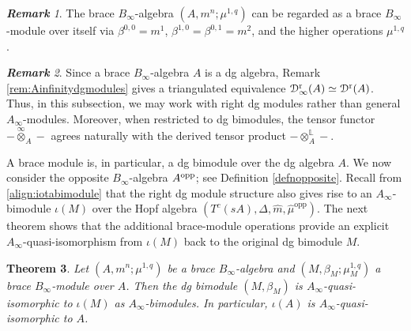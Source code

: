 \documentclass[a4paper, 11pt]{amsart}
\newtheorem{thm}{Theorem}[section]
\theoremstyle{definition}
\theoremstyle{remark}
\newtheorem{rem}[thm]{\bf Remark}
\numberwithin{equation}{section}
\newcommand{\RR}{\mathrm{r}}
\newcommand{\opp}{\mathrm{opp}}
\newcommand{\ED}{\EuScript{D}}
\begin{document}
\begin{rem}
The brace $B_\infty$-algebra $(A, m^n; \mu^{1,q})$ can be regarded as a brace $B_{\infty}$-module over itself via $\beta^{0,0}=m^1$, $\beta^{1,0}=\beta^{0,1}=m^2$, and the higher operations $\mu^{1,q}$.
\end{rem}

\begin{rem}\label{rem:dgainfinitymodules}
 Since a brace $B_\infty$-algebra $A$ is a dg algebra, Remark \ref{rem:Ainfinitydgmodules} gives a triangulated equivalence $\ED^{\RR}_\infty(A)\simeq \ED^{\RR}(A)$. Thus, in this subsection, we may work with right dg modules rather than general $A_\infty$-modules. Moreover, when restricted to dg bimodules, the tensor functor $-\overset{\infty}{\otimes}_A-$ agrees naturally with the derived tensor product $-\otimes_A^{\mathbb{L}}-$.
\end{rem}


A brace module is, in particular, a dg bimodule over the dg algebra $A$. We now consider the opposite $B_\infty$-algebra $A^{\rm opp}$; see Definition \ref{defnopposite}. Recall from \eqref{align:iotabimodule} that the right dg module structure also gives rise to an $A_\infty$-bimodule $\iota(M)$ over the Hopf algebra $(T^c(sA),\Delta,\widehat{m},\widehat{\mu}^{\opp})$. The next theorem shows that the additional brace-module operations provide an explicit $A_\infty$-quasi-isomorphism from $\iota(M)$ back to the original dg bimodule $M$.


\begin{thm}\label{thm:bracemodulegeneral}
Let $(A, m^n; \mu^{1, q})$ be a brace $B_{\infty}$-algebra and $(M, \beta_M; \mu_M^{1,q})$ a brace $B_{\infty}$-module over $A$.
Then the dg bimodule $(M, \beta_M)$ is $A_\infty$-quasi-isomorphic to $\iota(M)$ as $A_\infty$-bimodules.
In particular, $\iota(A)$ is $A_\infty$-quasi-isomorphic to $A$.
\end{thm}
\end{document}
